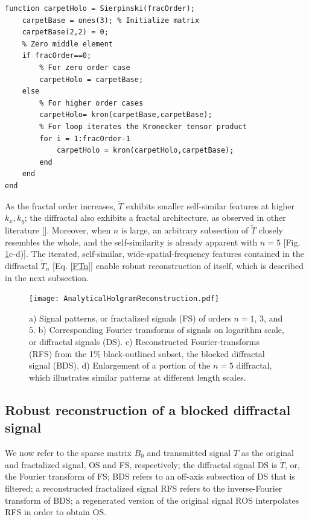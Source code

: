 \lstset{language = Matlab}
\begin{lstlisting}
function carpetHolo = Sierpinski(fracOrder);
	carpetBase = ones(3); % Initialize matrix
	carpetBase(2,2) = 0;
	% Zero middle element
	if fracOrder==0;
		% For zero order case
		carpetHolo = carpetBase;
	else
		% For higher order cases
		carpetHolo= kron(carpetBase,carpetBase);
		% For loop iterates the Kronecker tensor product
		for i = 1:fracOrder-1
			carpetHolo = kron(carpetHolo,carpetBase);
		end
	end
end
\end{lstlisting}

As the fractal order increases, $\tilde{T}$ exhibits smaller self-similar features at higher $k_x,k_y$;  the diffractal also exhibits a fractal architecture, as observed in other literature [\cite{Berry,Horvath}].  Moreover, when $n$ is large, an arbitrary subsection of $\tilde{T}$ closely resembles the whole, and the self-similarity is already apparent with $n= 5$ [Fig. \ref{AnalRecon}c-d)]. The iterated, self-similar, wide-spatial-frequency features contained in the diffractal $\tilde{T}_n$ [Eq. \ref{FTn}] enable robust reconstruction of itself, which is described in the next subsection.

\begin{figure}[t!]
 \texttt{[image: AnalyticalHolgramReconstruction.pdf]}
\caption{a) Signal patterns, or fractalized signals (FS) of orders $n = 1$, $3$, and $5$. b) Corresponding Fourier transforms of signals on logarithm scale, or diffractal signals (DS). c) Reconstructed Fourier-transforms (RFS) from the 1\% black-outlined subset, the blocked diffractal signal (BDS). d) Enlargement of a portion of the $n=5$ diffractal, which illustrates similar patterns at different length scales.}
\label{AnalRecon}
\end{figure}

\subsection{Robust reconstruction of a blocked diffractal signal} 

We now refer to the sparse matrix $B_0$ and transmitted signal $T$ as the original and fractalized signal, OS and FS, respectively; the diffractal signal DS is $\tilde{T}$, or, the Fourier transform of FS; BDS refers to an off-axis subsection of DS that is filtered; a reconstructed fractalized signal RFS refers to the inverse-Fourier transform of BDS; a regenerated version of the original signal ROS interpolates RFS in order to obtain OS.  

